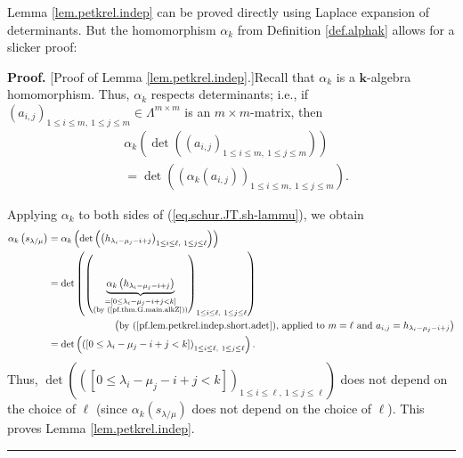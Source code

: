 \documentclass[numbers=enddot,12pt,final,onecolumn,notitlepage]{scrartcl}%
\theoremstyle{definition}
\newenvironment{proof}[1][Proof]{\noindent\textbf{#1.} }{\ \rule{0.5em}{0.5em}}
\newenvironment{vershort}{}{}
\begin{document}
\begin{vershort}
Lemma \ref{lem.petkrel.indep} can be proved directly using Laplace expansion
of determinants. But the homomorphism $\alpha_{k}$ from Definition
\ref{def.alphak} allows for a slicker proof:

\begin{proof}
[Proof of Lemma \ref{lem.petkrel.indep}.]Recall that $\alpha_{k}$ is a
$\mathbf{k}$-algebra homomorphism. Thus, $\alpha_{k}$ respects determinants;
i.e., if $\left(  a_{i,j}\right)  _{1\leq i\leq m,\ 1\leq j\leq m}\in
\Lambda^{m\times m}$ is an $m\times m$-matrix, then%
\begin{align}
&  \alpha_{k}\left(  \det\left(  \left(  a_{i,j}\right)  _{1\leq i\leq
m,\ 1\leq j\leq m}\right)  \right) \nonumber\\
&  =\det\left(  \left(  \alpha_{k}\left(  a_{i,j}\right)  \right)  _{1\leq
i\leq m,\ 1\leq j\leq m}\right)  . \label{pf.lem.petkrel.indep.short.adet}%
\end{align}


Applying $\alpha_{k}$ to both sides of (\ref{eq.schur.JT.sh-lammu}), we obtain%
\begin{align}
\alpha_{k}\left(  s_{\lambda/\mu}\right)   &  =\alpha_{k}\left(  \det\left(
\left(  h_{\lambda_{i}-\mu_{j}-i+j}\right)  _{1\leq i\leq\ell,\ 1\leq
j\leq\ell}\right)  \right) \nonumber\\
&  =\det\left(  \left(  \underbrace{\alpha_{k}\left(  h_{\lambda_{i}-\mu
_{j}-i+j}\right)  }_{\substack{=\left[  0\leq\lambda_{i}-\mu_{j}-i+j<k\right]
\\\text{(by (\ref{pf.thm.G.main.alkZ}))}}}\right)  _{1\leq i\leq\ell,\ 1\leq
j\leq\ell}\right) \nonumber\\
&  \ \ \ \ \ \ \ \ \ \ \ \ \ \ \ \ \ \ \ \ \left(  \text{by
(\ref{pf.lem.petkrel.indep.short.adet}), applied to }m=\ell\text{ and }%
a_{i,j}=h_{\lambda_{i}-\mu_{j}-i+j}\right) \nonumber\\
&  =\det\left(  \left(  \left[  0\leq\lambda_{i}-\mu_{j}-i+j<k\right]
\right)  _{1\leq i\leq\ell,\ 1\leq j\leq\ell}\right)  .
\label{pf.lem.petkrel.indep.short.1}%
\end{align}
Thus, $\det\left(  \left(  \left[  0\leq\lambda_{i}-\mu_{j}-i+j<k\right]
\right)  _{1\leq i\leq\ell,\ 1\leq j\leq\ell}\right)  $ does not depend on the
choice of $\ell$ (since $\alpha_{k}\left(  s_{\lambda/\mu}\right)  $ does not
depend on the choice of $\ell$). This proves Lemma \ref{lem.petkrel.indep}.
\end{proof}
\end{vershort}
\end{document}
